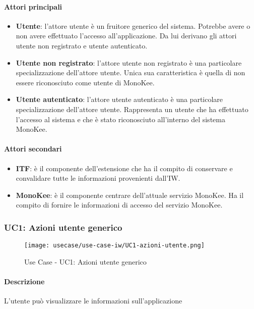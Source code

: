\paragraph{Attori principali}
\begin{itemize}
    \item \textbf{Utente}: l’attore utente è un fruitore generico del sistema. Potrebbe avere o non avere effettuato l’accesso all’applicazione. Da lui derivano gli attori utente non registrato e utente autenticato.	
    \item \textbf{Utente non registrato}: l’attore utente non registrato è una particolare specializzazione dell’attore utente. Unica sua caratteristica è quella di non essere riconosciuto come utente di MonoKee.
    \item \textbf{Utente autenticato}: l’attore utente autenticato è una particolare specializzazione dell’attore utente. Rappresenta un utente che ha effettuato l’accesso al sistema e che è stato riconosciuto all’interno del sistema MonoKee.
\end{itemize}
      
\paragraph{Attori secondari}
\begin{itemize}
    \item \textbf{ITF}: è il componente dell’estensione che ha il compito di conservare e convalidare tutte le informazioni provenienti dall’IW.
    \item \textbf{MonoKee}: è il componente centrare dell’attuale servizio MonoKee. Ha il compito di fornire le informazioni di accesso del servizio MonoKee. 
\end{itemize}
    


\subsubsection{UC1: Azioni utente generico}
\begin{figure}[!htbp] 
    \centering 
    \texttt{[image: usecase/use-case-iw/UC1-azioni-utente.png]} 
    \caption{Use Case - UC1: Azioni utente generico}
\end{figure}

\paragraph{Descrizione}  L’utente può visualizzare le informazioni sull’applicazione 
